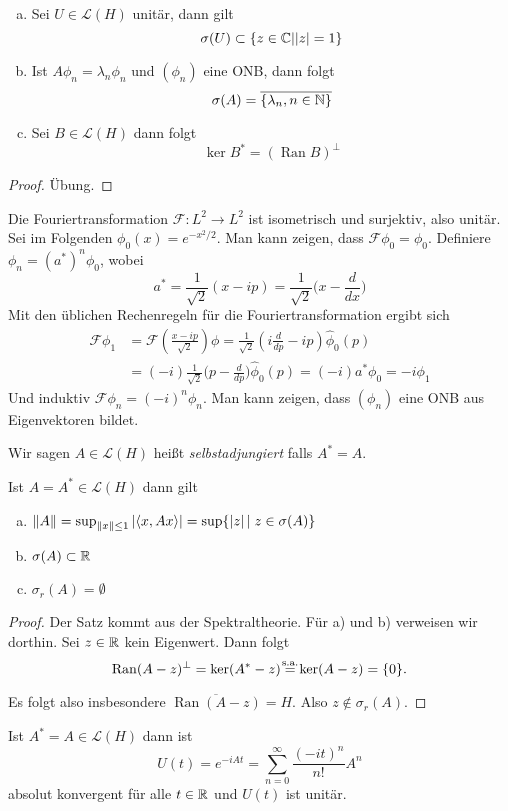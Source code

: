 \documentclass{mycourse}
\newcommand{\Ran}{\operatorname{Ran}}
\begin{document}
\begin{prop}
\begin{enumerate}[a)]
\item Sei $U\in \mathcal L(H)$ unitär, dann gilt
\[
	\sigma(U) \subset \{z\in \mathbb{C}| |z|=1\}
\]
\item Ist $A\phi_n=\lambda_n\phi_n$ und $(\phi_n)$ eine ONB, dann folgt
\[
\sigma(A)=\overline{\{\lambda_n, n\in \mathbb{N}\}}
\]
\item Sei $B\in \mathcal L(H)$ dann folgt
\[
\ker B^*=(\Ran B)^\perp
\]
\end{enumerate}
\end{prop}

\begin{proof}
Übung.
\end{proof}

\begin{ex*}
Die Fouriertransformation $\mathcal F: L^2 \to L^2$ ist isometrisch und surjektiv, also unitär. Sei im Folgenden $\phi_0(x)=e^{-x^2/2}$. Man kann zeigen, dass $\mathcal F \phi_0 = \phi_0$. Definiere $\phi_n = (a^*)^n \phi_0$, wobei 
\[
a^*=\frac{1}{\sqrt{2}} (x-ip) = \frac{1}{\sqrt{2}} \big( x- \frac{d}{dx}\big)
\]
Mit den üblichen Rechenregeln für die Fouriertransformation ergibt sich
\begin{align*}
\mathcal F \phi_1 &= \mathcal F(\frac{x-ip}{\sqrt{2}}) \phi = \frac{1}{\sqrt{2}} (i \frac{d}{dp} - ip) \hat \phi_0 (p)\\
&= (-i) \frac{1}{\sqrt{2}} \big(p-\frac{d}{dp}\big) \hat \phi_0(p) =(-i) a^* \phi_0=-i \phi_1
\end{align*}
Und induktiv $\mathcal F \phi_n = (-i)^n \phi_n$. Man kann zeigen, dass $(\phi_n)$ eine ONB aus Eigenvektoren bildet. 
\end{ex*}

\begin{df}
Wir sagen $A\in \mathcal L(H)$ heißt \emph{selbstadjungiert} falls $A^*=A$.
\end{df}

\begin{st}
Ist $A=A^*\in \mathcal L(H)$ dann gilt
\begin{enumerate}[a)]
\item $\|A\|=\sup_{\|x\|\le 1} |\langle x, Ax\rangle|= \sup\{|z| \, | \; z\in \sigma(A)\}$
\item $\sigma(A)\subset \mathbb{R}$
\item $\sigma_r(A)=\emptyset$
\end{enumerate}
\end{st}
\begin{proof}
Der Satz kommt aus der Spektraltheorie. Für a) und b) verweisen wir dorthin. Sei $z\in \mathbb{R}$ kein Eigenwert. Dann  folgt
\[
\Ran(A-z)^\perp = \ker(A^*-z)\stack{\text{s.a.}}=\ker(A-z)=\{0\}.
\]
Es folgt also insbesondere $\overline{\Ran(A-z)} = H$. Also $z\not\in \sigma_r(A)$.
\end{proof}
\begin{ex*}
Ist $A^*=A\in \mathcal L(H)$ dann ist
\[
U(t)=e^{-iAt} = \sum_{n=0}^\infty \frac{(-it)^n}{n!} A^n
\]
absolut konvergent für alle $t\in \mathbb{R}$ und $U(t)$ ist unitär.
\end{ex*}
\end{document}
